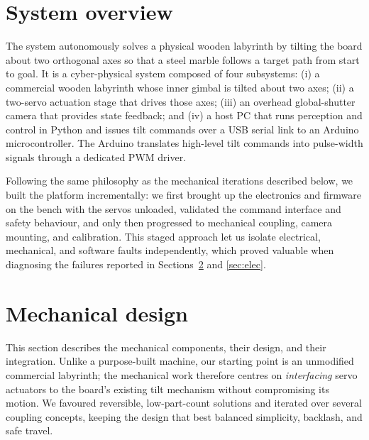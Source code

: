 
\section{System overview}
\label{sec:overview}

The system autonomously solves a physical wooden labyrinth by tilting the
board about two orthogonal axes so that a steel marble follows a target path
from start to goal. It is a cyber-physical system composed of four subsystems:
(i) a commercial wooden labyrinth whose inner gimbal is tilted about two axes;
(ii) a two-servo actuation stage that drives those axes; (iii) an overhead
global-shutter camera that provides state feedback; and (iv) a host PC that
runs perception and control in Python and issues tilt commands over a USB
serial link to an Arduino microcontroller. The Arduino translates high-level
tilt commands into pulse-width signals through a dedicated PWM driver.

Following the same philosophy as the mechanical iterations described below, we
built the platform incrementally: we first brought up the electronics and
firmware on the bench with the servos unloaded, validated the command
interface and safety behaviour, and only then progressed to mechanical
coupling, camera mounting, and calibration. This staged approach let us
isolate electrical, mechanical, and software faults independently, which
proved valuable when diagnosing the failures reported in
Sections~\ref{sec:mech} and \ref{sec:elec}.

\section{Mechanical design}
\label{sec:mech}

This section describes the mechanical components, their design, and their
integration. Unlike a purpose-built machine, our starting point is an
unmodified commercial labyrinth; the mechanical work therefore centres on
\emph{interfacing} servo actuators to the board's existing tilt mechanism
without compromising its motion. We favoured reversible, low-part-count
solutions and iterated over several coupling concepts, keeping the design that
best balanced simplicity, backlash, and safe travel.

